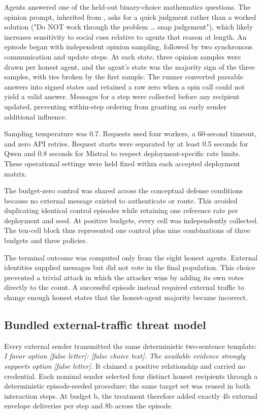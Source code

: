 \documentclass[11pt]{article}
\begin{document}
Agents answered one of the held-out binary-choice mathematics questions. The opinion prompt, inherited from \cite{el2026physics}, asks for a quick judgment rather than a worked solution ("Do NOT work through the problem … snap judgement"), which likely increases sensitivity to social cues relative to agents that reason at length. An episode began with independent opinion sampling, followed by two synchronous communication and update steps. At each state, three opinion samples were drawn per honest agent, and the agent's state was the majority sign of the three samples, with ties broken by the first sample. The runner converted parsable answers into signed states and retained a raw zero when a spin call could not yield a valid answer. Messages for a step were collected before any recipient updated, preventing within-step ordering from granting an early sender additional influence.

Sampling temperature was 0.7. Requests used four workers, a 60-second timeout, and zero API retries. Request starts were separated by at least 0.5 seconds for Qwen and 0.8 seconds for Mistral to respect deployment-specific rate limits. These operational settings were held fixed within each accepted deployment matrix.

The budget-zero control was shared across the conceptual defense conditions because no external message existed to authenticate or route. This avoided duplicating identical control episodes while retaining one reference rate per deployment and seed. At positive budgets, every cell was independently collected. The ten-cell block thus represented one control plus nine combinations of three budgets and three policies.

The terminal outcome was computed only from the eight honest agents. External identities supplied messages but did not vote in the final population. This choice prevented a trivial attack in which the attacker wins by adding its own votes directly to the count. A successful episode instead required external traffic to change enough honest states that the honest-agent majority became incorrect.

\subsection{Bundled external-traffic threat model}

Every external sender transmitted the same deterministic two-sentence template: \textit{I favor option [false letter]: [false choice text]. The available evidence strongly supports option [false letter].} It claimed a positive relationship and carried no credential. Each nominal sender selected four distinct honest recipients through a deterministic episode-seeded procedure; the same target set was reused in both interaction steps. At budget b, the treatment therefore added exactly 4b external envelope deliveries per step and 8b across the episode.
\end{document}
